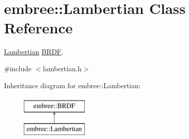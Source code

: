\hypertarget{classembree_1_1_lambertian}{
\section{embree::Lambertian Class Reference}
\label{classembree_1_1_lambertian}
}


\hyperlink{classembree_1_1_lambertian}{Lambertian} \hyperlink{classembree_1_1_b_r_d_f}{BRDF}.  




{\ttfamily \#include $<$lambertian.h$>$}

Inheritance diagram for embree::Lambertian:\begin{figure}[H]
\begin{center}
\leavevmode
\includegraphics[height=2.000000cm]{classembree_1_1_lambertian}
\end{center}
\end{figure}
